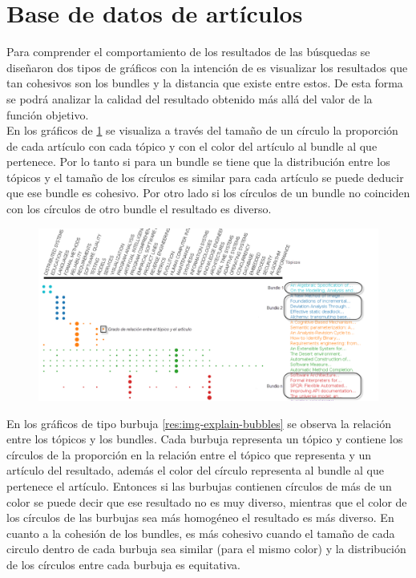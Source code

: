 \section{Base de datos de artículos}
Para comprender el comportamiento de los resultados de las búsquedas se diseñaron dos tipos de gráficos con la intención de es visualizar los resultados que tan cohesivos son los bundles y la distancia que existe entre estos. De esta forma se podrá analizar la calidad del resultado obtenido más allá del valor de la función objetivo.\\
En los gráficos de \ref{res:img-explain-bars} se visualiza a través del tamaño de un círculo la proporción de cada artículo con cada tópico y con el color del artículo al bundle al que pertenece. Por lo tanto si para un bundle se tiene que la distribución entre los tópicos y el tamaño de los círculos es similar para cada artículo se puede deducir que ese bundle es cohesivo. Por otro lado si los círculos de un bundle no coinciden con los círculos de otro bundle el resultado es diverso.
\begin{figure}[H]
  \centering
    \includegraphics[width=1\textwidth]{img/explain-bars.png}
  \caption{}
  \label{res:img-explain-bars}
\end{figure}

En los gráficos de tipo burbuja \ref{res:img-explain-bubbles} se observa la relación entre los tópicos y los bundles. Cada burbuja representa un tópico y contiene los círculos de la proporción en la relación entre el tópico que representa y un artículo del resultado, además el color del círculo representa al bundle al que pertenece el artículo. Entonces si las burbujas contienen círculos de más de un color se puede decir que ese resultado no es muy diverso, mientras que el color de los círculos de las burbujas sea más homogéneo el resultado es más diverso. En cuanto a la cohesión de los bundles, es más cohesivo cuando el tamaño de cada circulo dentro de cada burbuja sea similar (para el mismo color) y la distribución de los círculos entre cada burbuja es equitativa.


